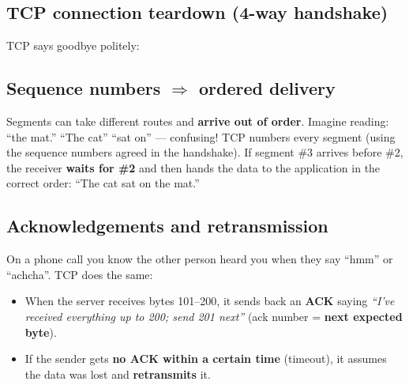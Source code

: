 \subsection{TCP connection teardown (4-way handshake)}
TCP says goodbye politely:
\begin{center}
\end{center}

\subsection{Sequence numbers $\Rightarrow$ ordered delivery}
Segments can take different routes and \textbf{arrive out of order}. Imagine reading: ``the mat.'' ``The cat'' ``sat on'' --- confusing! TCP numbers every segment (using the sequence numbers agreed in the handshake). If segment \#3 arrives before \#2, the receiver \textbf{waits for \#2} and then hands the data to the application in the correct order: ``The cat sat on the mat.''

\subsection{Acknowledgements and retransmission}
On a phone call you know the other person heard you when they say ``hmm'' or ``achcha''. TCP does the same:
\begin{itemize}
  \item When the server receives bytes 101--200, it sends back an \textbf{ACK} saying \emph{``I've received everything up to 200; send 201 next''} (ack number = \textbf{next expected byte}).
  \item If the sender gets \textbf{no ACK within a certain time} (timeout), it assumes the data was lost and \textbf{retransmits} it.
\end{itemize}

